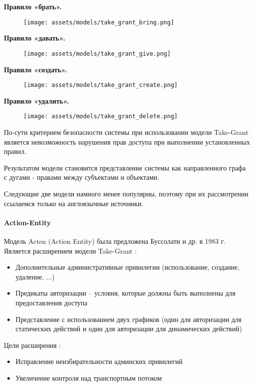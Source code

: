 \textbf{Правило «брать».}
\begin{figure}[H]
    \centering
    \texttt{[image: assets/models/take\_grant\_bring.png]}
\end{figure}

\textbf{Правило «давать».}
\begin{figure}[H]
    \centering
    \texttt{[image: assets/models/take\_grant\_give.png]}
\end{figure}

\textbf{Правило «создать».}
\begin{figure}[H]
    \centering
    \texttt{[image: assets/models/take\_grant\_create.png]}
\end{figure}

\textbf{Правило «удалить».}
\begin{figure}[H]
    \centering
    \texttt{[image: assets/models/take\_grant\_delete.png]}
\end{figure}

По-сути критерием безопасности системы при использовании модели Take-Grant является невозможность нарушения 
прав доступа при выполнении установленных правил.

Результатом модели становится представление системы как направленного графа с дугами - правами между субъектами 
и объектами.

Следующие две модели намного менее популярны, поэтому при их рассмотрении ссылаемся только на англоязычные 
источники.

\paragraph{Action-Entity}

Модель Acten (Action Entity) была предложена Буссолати и др. \autocite{Jalili} в 1983 г. Является расширением 
модели Take-Grant \autocite{SecModels}:
\begin{itemize}
    \item Дополнительные административные привилегии (использование, создание, удаление, ...)
    \item Предикаты авторизации -- условия, которые должны быть выполнены для предоставления доступа
    \item Представление с использованием двух графиков (один для авторизации для статических действий и один 
    для авторизации для динамических действий)
\end{itemize}
Цели расширения \autocite{Jalili}:
\begin{itemize}
    \item Исправление неизбирательности админских привилегий
    \item Увеличение контроля над транспортным потоком
\end{itemize}

